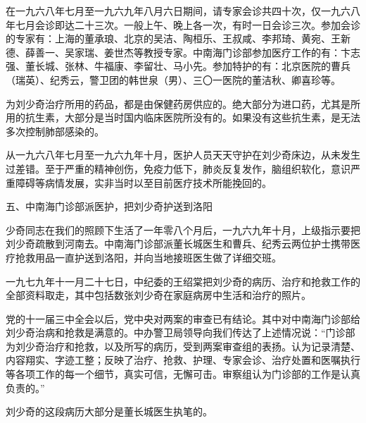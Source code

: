\begin{maonote}
在一九六八年七月至一九六九年八月六日期间，请专家会诊共四十次，仅一九六八年七月会诊即达二十三次。一般上午、晚上各一次，有时一日会诊三次。参加会诊的专家有：上海的董承琅、北京的吴洁、陶桓乐、王叔咸、李邦琦、黄宛、王新德、薛善一、吴家瑞、姜世杰等教授专家。中南海门诊部参加医疗工作的有：卞志强、董长城、张林、牛福康、李留壮、马小先。参加特护的有：北京医院的曹兵（瑞英）、纪秀云，警卫团的韩世泉（男）、三〇一医院的董洁秋、卿喜珍等。

为刘少奇治疗所用的药品，都是由保健药房供应的。绝大部分为进口药，尤其是所用的抗生素，大部分是当时国内临床医院所没有的。如果没有这些抗生素，是无法多次控制肺部感染的。

从一九六八年七月至一九六九年十月，医护人员天天守护在刘少奇床边，从未发生过差错。至于严重的精神创伤，免疫力低下，肺炎反复发作，脑组织软化，意识严重障碍等病情发展，实非当时以至目前医疗技术所能挽回的。

五、中南海门诊部派医护，把刘少奇护送到洛阳

少奇同志在我们的照顾下生活了一年零八个月后，一九六九年十月，上级指示要把刘少奇疏散到河南去。中南海门诊部派董长城医生和曹兵、纪秀云两位护士携带医疗抢救用品一直护送到洛阳，并向当地接班医生做了详细交班。

一九七九年十一月二十七日，中纪委的王绍棠把刘少奇的病历、治疗和抢救工作的全部资料取走，其中包括数张刘少奇在家庭病房中生活和治疗的照片。

党的十一届三中全会以后，党中央对两案的审查已有结论。其中对中南海门诊部给刘少奇治病和抢救是满意的。中办警卫局领导向我们传达了上述情况说：“门诊部为刘少奇治疗和抢救，以及所写的病历，受到两案审查组的表扬。认为记录清楚、内容翔实、字迹工整；反映了治疗、抢救、护理、专家会诊、治疗处置和医嘱执行等各项工作的每一个细节，真实可信，无懈可击。审察组认为门诊部的工作是认真负责的。”

刘少奇的这段病历大部分是董长城医生执笔的。
\end{maonote}
